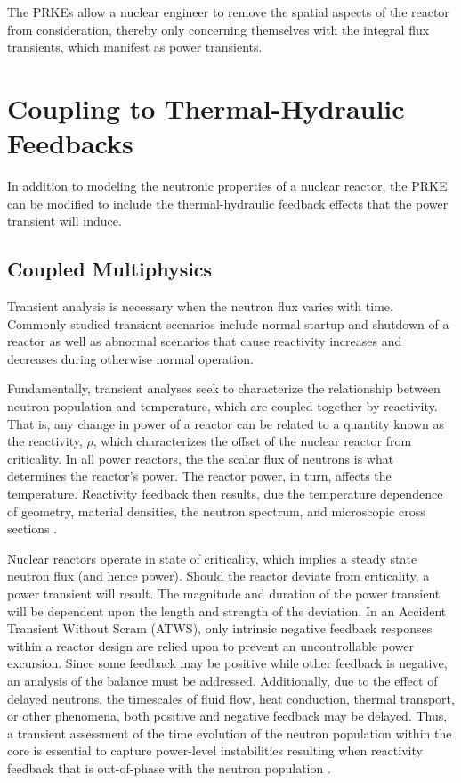 \documentclass[12pt]{article}
\begin{document}
The PRKEs allow a nuclear engineer to remove the spatial aspects of the
reactor from consideration, thereby only concerning themselves with the integral
flux transients, which manifest as power transients. 

\section{Coupling to Thermal-Hydraulic Feedbacks}

In addition to modeling
the neutronic properties of a nuclear reactor, the PRKE can be modified to
include the thermal-hydraulic feedback effects that the power transient will
induce.
\subsection{Coupled Multiphysics}
Transient analysis is necessary when the neutron flux varies with time.
Commonly studied transient scenarios include normal startup and shutdown of a
reactor as well as abnormal scenarios that cause reactivity increases and
decreases during otherwise normal operation.

Fundamentally, transient analyses seek to characterize the relationship between
neutron population and temperature, which are coupled together by reactivity.
That is, any change in power of a reactor can be related to a quantity known as
the reactivity, $\rho$, which characterizes the offset of the nuclear reactor
from criticality. In all power reactors, the the scalar flux of neutrons is what
determines the reactor's power. The reactor power, in turn, affects the
temperature. Reactivity feedback then results, due the temperature dependence of
geometry, material densities, the neutron spectrum, and microscopic cross
sections \cite{bell_nuclear_1970}.

Nuclear reactors operate in state of criticality, which implies a steady state
neutron flux (and hence power).  Should the reactor deviate from criticality, a
power transient will result. The magnitude and duration of the power transient
will be dependent upon the length and strength of the deviation.  In an
Accident Transient Without Scram (ATWS), only intrinsic negative feedback 
responses within a reactor design
are relied upon to prevent an uncontrollable power excursion.  Since some
feedback may be positive while other feedback is negative, an analysis of the
balance must be addressed. Additionally, due to the effect of delayed neutrons,
the timescales of fluid flow, heat conduction, thermal transport, or other
phenomena, both positive and negative feedback may be delayed. Thus, a transient
assessment of the time evolution of the neutron population within the core is
essential to capture power-level instabilities resulting when reactivity
feedback that is out-of-phase with the neutron population
\cite{stacey_nuclear_2007}.
\end{document}
